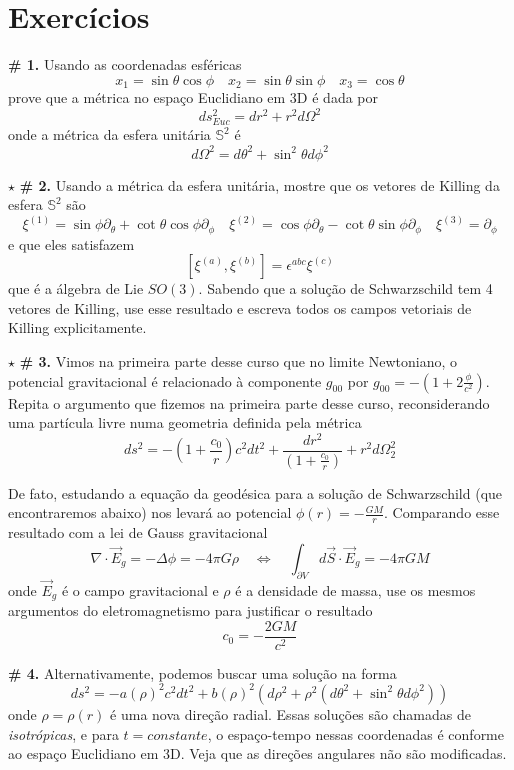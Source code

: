 \documentclass[11pt]{article}
\begin{document}
    \hypertarget{exercuxedcios}{%
\section{Exercícios}\label{exercuxedcios}}

    \textbf{\# 1.} Usando as coordenadas esféricas
\[ x_1 = \sin\theta \cos\phi\quad 
x_2 = \sin\theta \sin\phi\quad  
x_3 = \cos\theta\] prove que a métrica no espaço Euclidiano em 3D é dada
por \[ ds^2_{Euc} = dr^2 + r^2 d\Omega^2 \] onde a métrica da esfera
unitária \(\mathbb{S}^2\) é
\[ d\Omega^2 = d\theta^2 + \sin^2 \theta d\phi^2 \]

\(\star\) \textbf{\# 2.} Usando a métrica da esfera unitária, mostre que
os vetores de Killing da esfera \(\mathbb{S}^2\) são \[ 
\xi^{(1)} = \sin\phi \partial_\theta + \cot\theta\cos\phi \partial_\phi\quad 
\xi^{(2)} = \cos\phi \partial_\theta - \cot\theta\sin\phi \partial_\phi \quad
\xi^{(3)} = \partial_\phi
\] e que eles satisfazem
\[ [\xi^{(a)}, \xi^{(b)}] = \epsilon^{abc}\xi^{(c)}  \] que é a álgebra
de Lie \(SO(3)\). Sabendo que a solução de Schwarzschild tem 4 vetores
de Killing, use esse resultado e escreva todos os campos vetoriais de
Killing explicitamente.

\(\star\) \textbf{\# 3.} Vimos na primeira parte desse curso que no
limite Newtoniano, o potencial gravitacional é relacionado à componente
\(g_{00}\) por \(g_{00} = -\left(1 + 2\frac{\phi}{c^2}\right)\). Repita
o argumento que fizemos na primeira parte desse curso, reconsiderando
uma partícula livre numa geometria definida pela métrica
\[ ds^2 = -\left(1 + \frac{c_0}{r}\right) c^2 dt^2 + \frac{dr^2}{\left(1 + \frac{c_0}{r}\right)} + r^2 d\Omega_2^2 \]

De fato, estudando a equação da geodésica para a solução de
Schwarzschild (que encontraremos abaixo) nos levará ao potencial
\(\phi(r) = - \frac{GM}{r}\). Comparando esse resultado com a lei de
Gauss gravitacional
\[\nabla\cdot \vec{E}_g = -\Delta\phi = - 4 \pi G \rho  \quad \Leftrightarrow \quad 
\int_{\partial V} d \vec{S}\cdot \vec{E}_g  = -4 \pi G M \] onde
\(\vec{E}_g\) é o campo gravitacional e \(\rho\) é a densidade de massa,
use os mesmos argumentos do eletromagnetismo para justificar o resultado
\[ c_0 = - \frac{2GM}{c^2} \]

\textbf{\# 4.} Alternativamente, podemos buscar uma solução na forma
\[ ds^2 = - a(\rho)^2 c^2 dt^2 + b(\rho)^2 (d\rho^2 + \rho^2(d\theta^2 + \sin^2\theta d\phi^2)) \]
onde \(\rho=\rho(r)\) é uma nova direção radial. Essas soluções são
chamadas de \emph{isotrópicas}, e para \(t=constante\), o espaço-tempo
nessas coordenadas é conforme ao espaço Euclidiano em 3D. Veja que as
direções angulares não são modificadas.
\end{document}

